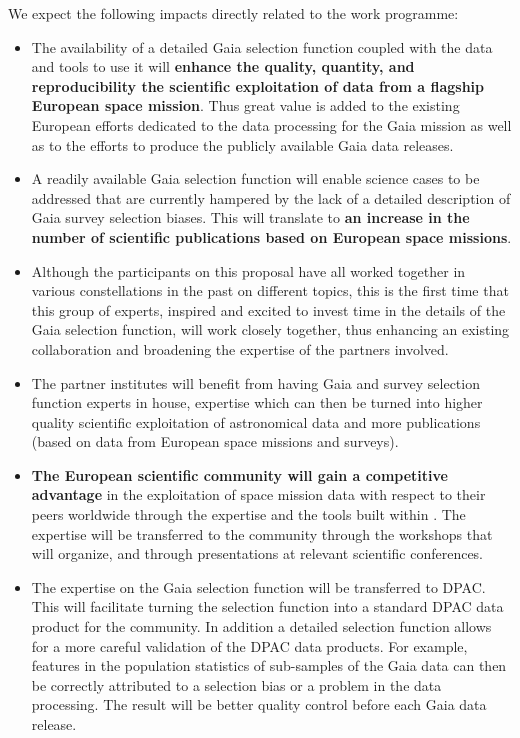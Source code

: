 We expect the following impacts directly related to the work programme:
\begin{itemize}
    \item The availability of a detailed Gaia selection function coupled with the data and tools to use it will \textbf{enhance the quality, quantity, and reproducibility the scientific exploitation of data from a flagship European space mission}. Thus great value is added to the existing European efforts dedicated to the data processing for the Gaia mission as well as to the efforts to produce the publicly available Gaia data releases.
    \item A readily available Gaia selection function will enable science cases to be addressed that are currently hampered by the lack of a detailed description of Gaia survey selection biases. This will translate to \textbf{an increase in the number of scientific publications based on European space missions}.
    \item Although the participants on this proposal have all worked together in various constellations in the past on different topics, this is the first time that this group of experts, inspired and excited to invest time in the details of the Gaia selection function, will work closely together, thus enhancing an existing collaboration and broadening the expertise of the partners involved.
    \item The partner institutes will benefit from having Gaia and survey selection function experts in house, expertise which can then be turned into higher quality scientific exploitation of astronomical data and more publications (based on data from European space missions and surveys).
    \item \textbf{The European scientific community will gain a competitive advantage} in the exploitation of space mission data with respect to their peers worldwide through the expertise and the tools built within {\acro}. The expertise will be transferred to the community through the workshops that {\acro} will organize, and through presentations at relevant scientific conferences.
    \item The expertise on the Gaia selection function will be transferred to DPAC. This will facilitate turning the selection function into a standard DPAC data product for the community. In addition a detailed selection function allows for a more careful validation of the DPAC data products. For example, features in the population statistics of sub-samples of the Gaia data can then be correctly attributed to a selection bias or a problem in the data processing. The result will be better quality control before each Gaia data release.

\end{itemize}
